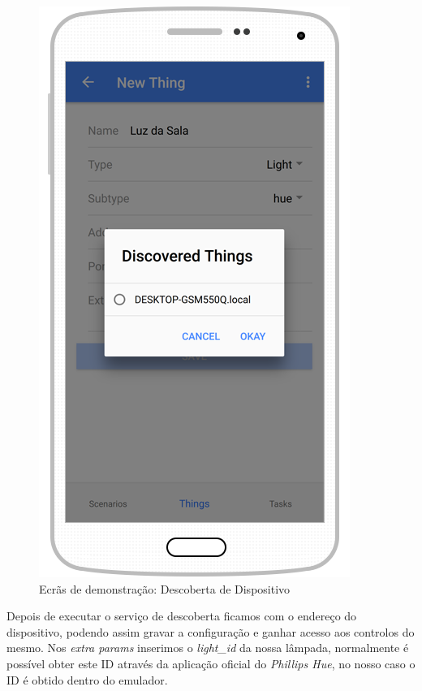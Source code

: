 \begin{figure}[H]
  \centering
        \includegraphics[scale=0.6]{img/demo/new_thing_discovery.png}
  \caption{Ecrãs de demonstração: Descoberta de Dispositivo}
\end{figure}

Depois de executar o serviço de descoberta ficamos com o endereço do dispositivo, podendo assim gravar a configuração e ganhar acesso aos controlos do mesmo. Nos \textit{extra params} inserimos o \textit{light\_id} da nossa lâmpada, normalmente é possível obter este ID através da aplicação oficial do \textit{Phillips Hue}, no nosso caso o ID é obtido dentro do emulador.

